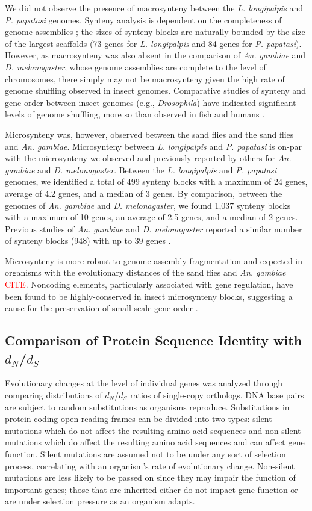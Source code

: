 We did not observe the presence of macrosynteny between the \emph{L. longipalpis} and \emph{P. papatasi} genomes.  Synteny analysis is dependent on the completeness of genome assemblies \cite{Heger2007}; the sizes of synteny blocks are naturally bounded by the size of the largest scaffolds (73 genes for \emph{L. longipalpis} and 84 genes for \emph{P. papatasi}).  However, as macrosynteny was also absent in the comparison of \emph{An. gambiae} and \emph{D. melanogaster}, whose genome assemblies are complete to the level of chromosomes, there simply may not be macrosynteny given the high rate of genome shuffling observed in insect genomes. Comparative studies of synteny and gene order between insect genomes (e.g., \emph{Drosophila}) have indicated significant levels of genome shuffling, more so than observed in fish and humans \cite{Ranz2001,Zdobnov2002,Zdobnov2007}.

Microsynteny was, however, observed between the sand flies and the sand flies and \emph{An. gambiae}. Microsynteny between \emph{L. longipalpis} and \emph{P. papatasi} is on-par with the microsynteny we observed and previously reported by others for \emph{An. gambiae} and \emph{D. melonagaster}.  Between the \emph{L. longipalpis} and \emph{P. papatasi} genomes, we identified a total of 499 synteny blocks with a maximum of 24 genes, average of 4.2 genes, and a median of 3 genes. By comparison, between the genomes of \emph{An. gambiae} and \emph{D. melonagaster}, we found 1,037 synteny blocks with a maximum of 10 genes, an average of 2.5 genes, and a median of 2 genes. Previous studies of \emph{An. gambiae} and \emph{D. melonagaster} reported a similar number of synteny blocks (948) with up to 39 genes \cite{Zdobnov2002}.  

Microsynteny is more robust to genome assembly fragmentation \cite{Zdobnov2002} and expected in organisms with the evolutionary distances of the sand flies and \emph{An. gambiae} \textcolor{red}{CITE}. Noncoding elements, particularly associated with gene regulation, have been found to be highly-conserved in insect microsynteny blocks, suggesting a cause for the preservation of small-scale gene order \cite{Engstrom2007}.

\subsection{Comparison of Protein Sequence Identity with $d_N$/$d_S$}
Evolutionary changes at the level of individual genes was analyzed through comparing distributions of $d_N$/$d_S$ ratios of single-copy orthologs. DNA base pairs are subject to random substitutions as organisms reproduce.  Substitutions in protein-coding open-reading frames can be divided into two types: silent mutations which do not affect the resulting amino acid sequences and non-silent mutations which do affect the resulting amino acid sequences and can affect gene function.  Silent mutations are assumed not to be under any sort of selection process, correlating with an organism's rate of evolutionary change.  Non-silent mutations are less likely to be passed on since they may impair the function of important genes; those that are inherited either do not impact gene function or are under selection pressure as an organism adapts.

